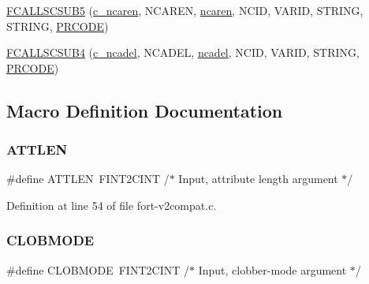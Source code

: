 \begin{DoxyCompactItemize}
\hyperlink{fort-v2compat_8c_ae0df920cf268e71f8e48aca0a84b25c7}{F\+C\+A\+L\+L\+S\+C\+S\+U\+B5} (\hyperlink{nf__v2compat_8c_acaa8977afd889e7c438d59b542effb29}{c\+\_\+ncaren}, N\+C\+A\+R\+EN, \hyperlink{nf__fortv2_8f90_ab82f351050b86a1f5c96a8ef0f5fd46c}{ncaren}, N\+C\+ID, V\+A\+R\+ID, S\+T\+R\+I\+NG, S\+T\+R\+I\+NG, \hyperlink{fort-v2compat_8c_ae2352f39cbd25bcaf1bedbbb12db73fe}{P\+R\+C\+O\+DE})
\item 
\hyperlink{fort-v2compat_8c_ac6de05a02619ce68727ecc66fcc1bd1d}{F\+C\+A\+L\+L\+S\+C\+S\+U\+B4} (\hyperlink{nf__v2compat_8c_a7bd0c5f885c4efae5a33518503d4b5df}{c\+\_\+ncadel}, N\+C\+A\+D\+EL, \hyperlink{nf__fortv2_8f90_aca410e210247338c8c44f4cd02aacdec}{ncadel}, N\+C\+ID, V\+A\+R\+ID, S\+T\+R\+I\+NG, \hyperlink{fort-v2compat_8c_ae2352f39cbd25bcaf1bedbbb12db73fe}{P\+R\+C\+O\+DE})
\end{DoxyCompactItemize}


\subsection{Macro Definition Documentation}
\mbox{\label{fort-v2compat_8c_a5274f0ce0562c9ab9da4004e7d85d738}} 
\subsubsection{\texorpdfstring{A\+T\+T\+L\+EN}{ATTLEN}}
{\footnotesize\ttfamily \#define A\+T\+T\+L\+EN~F\+I\+N\+T2\+C\+I\+NT	/$\ast$ Input, attribute length argument $\ast$/}



Definition at line 54 of file fort-\/v2compat.\+c.

\mbox{\label{fort-v2compat_8c_abd5253773c995afc2eed8dee4a76a552}} 
\subsubsection{\texorpdfstring{C\+L\+O\+B\+M\+O\+DE}{CLOBMODE}}
{\footnotesize\ttfamily \#define C\+L\+O\+B\+M\+O\+DE~F\+I\+N\+T2\+C\+I\+NT	/$\ast$ Input, clobber-\/mode argument $\ast$/}



